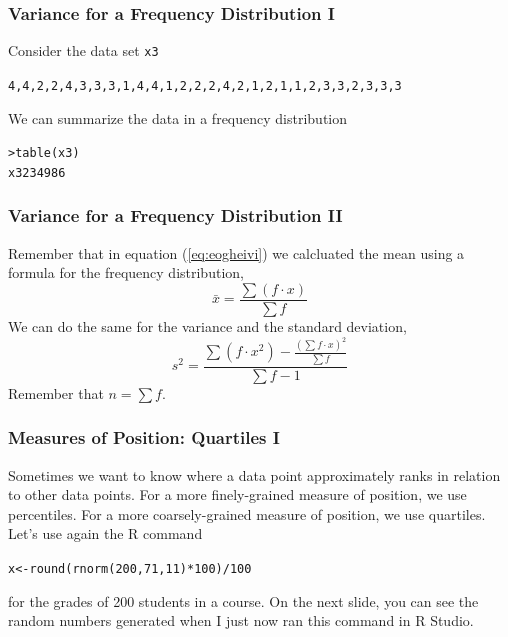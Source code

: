 \documentclass[xcolor=dvipsnames]{beamer}
\begin{document}
\begin{frame}
  \frametitle{Variance for a Frequency Distribution I}
Consider the data set \texttt{x3}
\begin{alltt}
4,4,2,2,4,3,3,3,1,4,4,1,2,2,2,4,2,1,2,1,1,2,3,3,2,3,3,3
\end{alltt}
We can summarize the data in a frequency distribution
\begin{alltt}
> table(x3)\newline
x3 2 3 4  9 8 6 
\end{alltt}
\end{frame}

\begin{frame}
  \frametitle{Variance for a Frequency Distribution II}
Remember that in equation (\ref{eq:eogheivi}) we calcluated the mean using a
formula for the frequency distribution,
\begin{equation}
  \label{eq:beingeip}
  \bar{x}=\frac{\sum{}\left(f\cdot{}x\right)}{\sum{}f}
\end{equation}
We can do the same for the variance and the standard deviation,
\begin{equation}
  \label{eq:iefoopoo}
  s^{2}=\frac{\sum{}\left(f\cdot{}x^{2}\right)-\frac{\left(\sum{}f\cdot{}x\right)^{2}}{\sum{}f}}{\sum{}f-1}
\end{equation}
Remember that $n=\sum{}f$.
\end{frame}

\begin{frame}
  \frametitle{Measures of Position: Quartiles I}
Sometimes we want to know where a data point approximately ranks in
relation to other data points. For a more finely-grained measure of
position, we use percentiles. For a more coarsely-grained measure of
position, we use quartiles. Let's use again the R command
\begin{alltt}
  x<-round(rnorm(200,71,11)*100)/100
\end{alltt}
for the grades of 200 students in a course. On the next slide, you can
see the random numbers generated when I just now ran this command in R Studio.
\end{frame}
\end{document}
